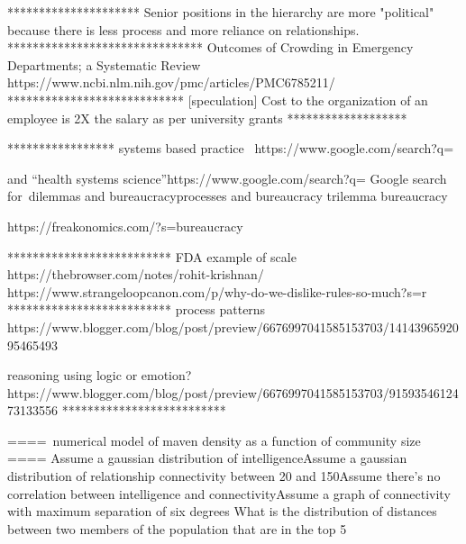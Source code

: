 *********************
Senior positions in the hierarchy are more "political" because there is less process and more reliance on relationships.
*******************************
Outcomes of Crowding in Emergency Departments; a Systematic Review
https://www.ncbi.nlm.nih.gov/pmc/articles/PMC6785211/ 
****************************
[speculation] Cost to the organization of an employee is 2X the salary as per university grants
*******************

*****************
systems based practice 
https://www.google.com/search?q=%

and “health systems science”https://www.google.com/search?q=%
Google search for dilemmas and bureaucracyprocesses and bureaucracy
trilemma bureaucracy

https://freakonomics.com/?s=bureaucracy

**************************
FDA example of scale
https://thebrowser.com/notes/rohit-krishnan/
https://www.strangeloopcanon.com/p/why-do-we-dislike-rules-so-much?s=r
**************************
process patterns
https://www.blogger.com/blog/post/preview/6676997041585153703/1414396592095465493

reasoning using logic or emotion?
https://www.blogger.com/blog/post/preview/6676997041585153703/9159354612473133556
**************************

==== numerical model of maven density as a function of community size ====
Assume a gaussian distribution of intelligenceAssume a gaussian distribution of relationship connectivity between 20 and 150Assume there's no correlation between intelligence and connectivityAssume a graph of connectivity with maximum separation of six degrees
What is the distribution of distances between two members of the population that are in the top 5%
